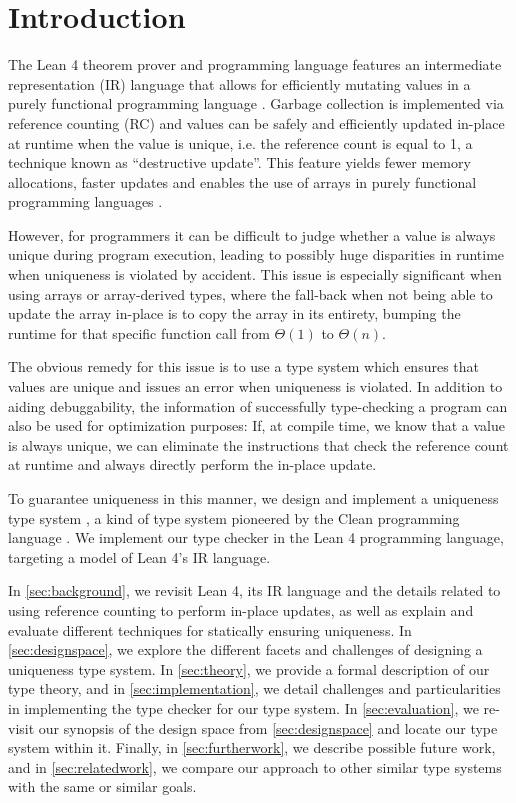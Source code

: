 \chapter{Introduction}\label{sec:intro}

The Lean 4 theorem prover and programming language \citep{de_moura_lean_2021} features an intermediate representation (IR) language that allows for efficiently mutating values in a purely functional programming language \citep{ullrich_counting_2020}. Garbage collection is implemented via reference counting (RC) and values can be safely and efficiently updated in-place at runtime when the value is unique, i.e. the reference count is equal to 1, a technique known as ``destructive update''. This feature yields fewer memory allocations, faster updates and enables the use of arrays in purely functional programming languages \citep{ullrich_counting_2020}.

However, for programmers it can be difficult to judge whether a value is always unique during program execution, leading to possibly huge disparities in runtime when uniqueness is violated by accident. This issue is especially significant when using arrays or array-derived types, where the fall-back when not being able to update the array in-place is to copy the array in its entirety, bumping the runtime for that specific function call from $\Theta(1)$ to $\Theta(n)$.

The obvious remedy for this issue is to use a type system which ensures that values are unique and issues an error when uniqueness is violated. In addition to aiding debuggability, the information of successfully type-checking a program can also be used for optimization purposes: If, at compile time, we know that a value is always unique, we can eliminate the instructions that check the reference count at runtime and always directly perform the in-place update.

To guarantee uniqueness in this manner, we design and implement a uniqueness type system \citep{sergey_linearity_2022}, a kind of type system pioneered by the Clean programming language \citep{smetsers_guaranteeing_1994}. We implement our type checker in the Lean 4 programming language, targeting a model of Lean 4's IR language.

In \cref{sec:background}, we revisit Lean 4, its IR language and the details related to using reference counting to perform in-place updates, as well as explain and evaluate different techniques for statically ensuring uniqueness. In \cref{sec:designspace}, we explore the different facets and challenges of designing a uniqueness type system. In \cref{sec:theory}, we provide a formal description of our type theory, and in \cref{sec:implementation}, we detail challenges and particularities in implementing the type checker for our type system. In \cref{sec:evaluation}, we re-visit our synopsis of the design space from \cref{sec:designspace} and locate our type system within it. Finally, in \cref{sec:furtherwork}, we describe possible future work, and in \cref{sec:relatedwork}, we compare our approach to other similar type systems with the same or similar goals.